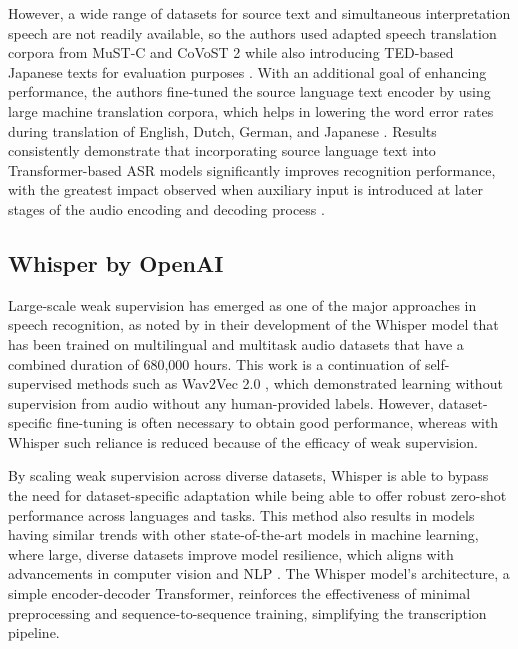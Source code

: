 However, a wide range of datasets for source text and simultaneous interpretation speech are not readily available, so the authors used adapted speech translation corpora from MuST-C and CoVoST 2 while also introducing TED-based Japanese texts for evaluation purposes \parencite{taniguchi2022transformer}. With an additional goal of enhancing performance, the authors fine-tuned the source language text encoder by using large machine translation corpora, which helps in lowering the word error rates during translation of English, Dutch, German, and Japanese \parencite{Taniguchi2024Pretraining}. Results consistently demonstrate that incorporating source language text into Transformer-based ASR models significantly improves recognition performance, with the greatest impact observed when auxiliary input is introduced at later stages of the audio encoding and decoding process \parencite{Futami2020Bidirectional}.

\subsection{Whisper by OpenAI}
Large-scale weak supervision has emerged as one of the major approaches in speech recognition, as noted by \textcite{radford2023robust} in their development of the Whisper model that has been trained on multilingual and multitask audio datasets that have a combined duration of 680,000 hours. This work is a continuation of self-supervised methods such as Wav2Vec 2.0 \parencite{baevski2020wav2vec}, which demonstrated learning without supervision from audio without any human-provided labels. However, dataset-specific fine-tuning is often necessary to obtain good performance, whereas with Whisper such reliance is reduced because of the efficacy of weak supervision.

By scaling weak supervision across diverse datasets, Whisper is able to bypass the need for dataset-specific adaptation while being able to offer robust zero-shot performance across languages and tasks. This method also results in models having similar trends with other state-of-the-art models in machine learning, where large, diverse datasets improve model resilience, which aligns with advancements in computer vision \parencite{kolesnikov2020big} and NLP \parencite{radford2019language}. The Whisper model's architecture, a simple encoder-decoder Transformer, reinforces the effectiveness of minimal preprocessing and sequence-to-sequence training, simplifying the transcription pipeline.

